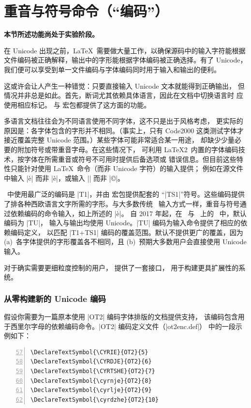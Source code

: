 \documentclass[a4paper]{l3doc}
\begin{document}
\part{重音与符号命令（“编码”）}
\label{part:enc}

\textbf{本节所述功能尚处于实验阶段。}

在 Unicode 出现之前，\LaTeX\ 需要做大量工作，以确保源码中的输入字符能根据
文件编码被正确解释，输出中的字形能根据字体编码被正确选择。有了 Unicode，
我们便可以享受到单一文件编码与字体编码同时用于输入和输出的便利。

这或许会让人产生一种错觉：只要直接输入 Unicode 文本就能得到正确输出，
但情况并非总是如此。首先，断词尤其依赖具体语言，因此在文档中切换语言时
应使用相应标记。 与  宏包都提供了这方面的功能。

多语言文档往往会为不同语言使用不同字体，这不只是出于风格考虑，
更实际的原因是：各字体包含的字形并不相同。（事实上，只有 Code2000
这类测试字体才接近覆盖完整 Unicode 范围。）某些字体可能非常适合某一用途，
却缺少少量必要的附加符号或带重音字母。在这些情况下， 可利用
\LaTeX2\ 内置的字体编码技术，按字体在所需重音或符号不可用时提供后备选项或
错误信息。但目前这些特性只能针对使用 \LaTeX\ 命令（而非 Unicode 字符）的输入提供；
例如在源文件中输入 |\`e| 而非 |è|，或输入 |\textcopyright| 而非 |©|。

\LaTeXe\ 中使用最广泛的编码是 |T1|，并由  宏包提供配套的
“|TS1|”符号。这些编码提供了排各种西欧语言文字所需的字形。与大多数传统
\LaTeXe\ 输入方式一样，重音与符号通过依赖编码的命令输入，如上所述的 |\`e|。
自 2017 年起，在 \XeTeX\ 与 \LuaTeX\ 上的 \LaTeXe\ 中，默认编码为 |TU|，
输入与输出均使用 Unicode。|TU| 编码为输入命令提供了相应的依赖编码定义，
以匹配 |T1+TS1| 编码的覆盖范围。默认不提供更广的覆盖，因为
(a)~各字体提供的字形覆盖各不相同，且 (b)~预期大多数用户会直接使用 Unicode 输入。

对于确实需要更细粒度控制的用户， 提供了一套接口，
用于构建更具扩展性的系统。


\section{从零构建新的 Unicode 编码}

假设你需要为一篇原本使用 |OT2| 编码字体排版的文档提供支持，
该编码包含用于西里尔字母的依赖编码命令。|OT2| 编码定义文件（|ot2enc.def|）
中的一段示例如下：
\begin{Verbatim}[numbers=left,firstnumber=57]
\DeclareTextSymbol{\CYRIE}{OT2}{5}
\DeclareTextSymbol{\CYRDJE}{OT2}{6}
\DeclareTextSymbol{\CYRTSHE}{OT2}{7}
\DeclareTextSymbol{\cyrnje}{OT2}{8}
\DeclareTextSymbol{\cyrlje}{OT2}{9}
\DeclareTextSymbol{\cyrdzhe}{OT2}{10}
\end{Verbatim}
\end{document}
